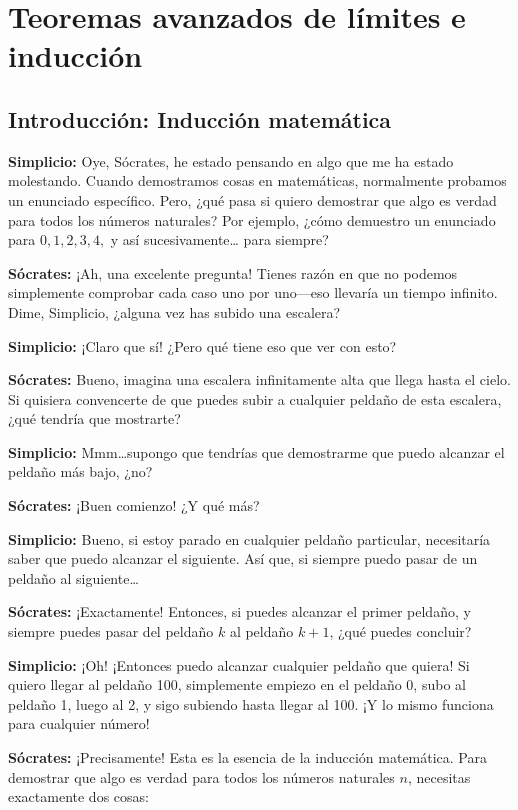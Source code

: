 \chapter{Teoremas avanzados de límites e inducción}

\section{Introducción: Inducción matemática}

\textbf{Simplicio:} Oye, Sócrates, he estado pensando en algo que me ha
estado molestando. Cuando demostramos cosas en matemáticas, normalmente
probamos un enunciado específico. Pero, ¿qué pasa si quiero demostrar que
algo es verdad para todos los números naturales? Por ejemplo, ¿cómo
demuestro un enunciado para $0, 1, 2, 3, 4,$ y así sucesivamente\ldots
para siempre?

\textbf{Sócrates:} ¡Ah, una excelente pregunta! Tienes razón en que no
podemos simplemente comprobar cada caso uno por uno—eso llevaría un tiempo
infinito. Dime, Simplicio, ¿alguna vez has subido una escalera?

\textbf{Simplicio:} ¡Claro que sí! ¿Pero qué tiene eso que ver con esto?

\textbf{Sócrates:} Bueno, imagina una escalera infinitamente alta que
llega hasta el cielo. Si quisiera convencerte de que puedes subir a
cualquier peldaño de esta escalera, ¿qué tendría que mostrarte?

\textbf{Simplicio:} Mmm\ldots supongo que tendrías que demostrarme que
puedo alcanzar el peldaño más bajo, ¿no?

\textbf{Sócrates:} ¡Buen comienzo! ¿Y qué más?

\textbf{Simplicio:} Bueno, si estoy parado en cualquier peldaño
particular, necesitaría saber que puedo alcanzar el siguiente. Así que, si
siempre puedo pasar de un peldaño al siguiente\ldots

\textbf{Sócrates:} ¡Exactamente! Entonces, si puedes alcanzar el primer
peldaño, y siempre puedes pasar del peldaño $k$ al peldaño $k+1$, ¿qué
puedes concluir?

\textbf{Simplicio:} ¡Oh! ¡Entonces puedo alcanzar cualquier peldaño que
quiera! Si quiero llegar al peldaño 100, simplemente empiezo en el peldaño
0, subo al peldaño 1, luego al 2, y sigo subiendo hasta llegar al 100. ¡Y
lo mismo funciona para cualquier número!

\textbf{Sócrates:} ¡Precisamente! Esta es la esencia de la inducción
matemática. Para demostrar que algo es verdad para todos los números
naturales $n$, necesitas exactamente dos cosas:

